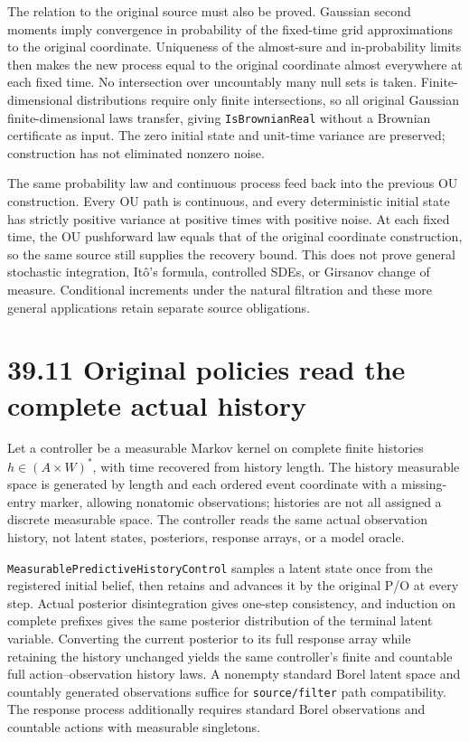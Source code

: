 \documentclass[
  english,
  11pt,
  oneside]{book}
\newcounter{none} %
\begin{document}
The relation to the original source must also be proved. Gaussian second moments imply convergence in probability of the fixed-time grid approximations to the original coordinate. Uniqueness of the almost-sure and in-probability limits then makes the new process equal to the original coordinate almost everywhere at each fixed time. No intersection over uncountably many null sets is taken. Finite-dimensional distributions require only finite intersections, so all original Gaussian finite-dimensional laws transfer, giving \nolinkurl{IsBrownianReal} without a Brownian certificate as input. The zero initial state and unit-time variance are preserved; construction has not eliminated nonzero noise.

The same probability law and continuous process feed back into the previous OU construction. Every OU path is continuous, and every deterministic initial state has strictly positive variance at positive times with positive noise. At each fixed time, the OU pushforward law equals that of the original coordinate construction, so the same source still supplies the recovery bound. This does not prove general stochastic integration, Itô's formula, controlled SDEs, or Girsanov change of measure. Conditional increments under the natural filtration and these more general applications retain separate source obligations.

\section{39.11 Original policies read the complete actual history}\label{original-policies-read-the-complete-actual-history}

Let a controller be a measurable Markov kernel on complete finite histories \(h\in(A\times W)^*\), with time recovered from history length. The history measurable space is generated by length and each ordered event coordinate with a missing-entry marker, allowing nonatomic observations; histories are not all assigned a discrete measurable space. The controller reads the same actual observation history, not latent states, posteriors, response arrays, or a model oracle.

\nolinkurl{MeasurablePredictiveHistoryControl} samples a latent state once from the registered initial belief, then retains and advances it by the original P/O at every step. Actual posterior disintegration gives one-step consistency, and induction on complete prefixes gives the same posterior distribution of the terminal latent variable. Converting the current posterior to its full response array while retaining the history unchanged yields the same controller's finite and countable full action--observation history laws. A nonempty standard Borel latent space and countably generated observations suffice for \nolinkurl{source/filter} path compatibility. The response process additionally requires standard Borel observations and countable actions with measurable singletons.
\end{document}
